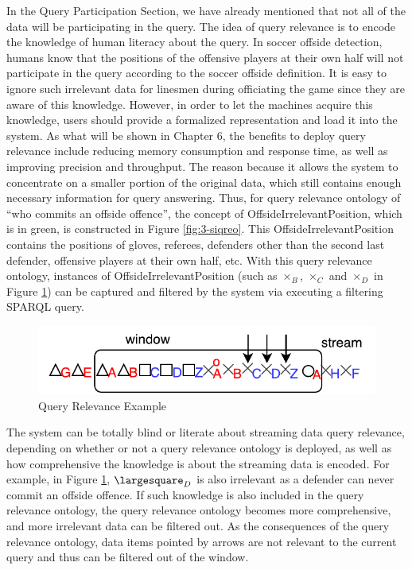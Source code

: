 In the Query Participation Section, we have already mentioned that not all of the data will be participating in the query.
The idea of query relevance is to encode the knowledge of human literacy about the query. 
In soccer offside detection, humans know that the positions of the offensive players at their own half will not participate in the query according to the soccer offside definition. 
It is easy to ignore such irrelevant data for linesmen during officiating the game since they are aware of this knowledge. 
However, in order to let the machines acquire this knowledge, users should provide a formalized representation and load it into the system. 
As what will be shown in Chapter 6, the benefits to deploy query relevance include reducing memory consumption and response time, as well as improving precision and throughput. 
The reason because it allows the system to concentrate on a smaller portion of the original data, which still contains enough necessary information for query answering. 
Thus, for query relevance ontology of ``who commits an offside offence'', the concept of OffsideIrrelevantPosition, which is in green, is constructed in Figure \ref{fig:3-siqreo}. 
This OffsideIrrelevantPosition contains the positions of gloves, referees, defenders other than the second last defender, offensive players at their own half, etc. 
With this query relevance ontology, instances of OffsideIrrelevantPosition (such as  $\times_{B}$, $\times_{C}$ and $\times_{D}$ in Figure \ref{fig:3-siqre}) can be captured and filtered by the system via executing a filtering SPARQL query. 

\begin{figure}[!htbp]
	\centering
    \includegraphics[width=5in]{img/3-siqre.pdf}
    \caption{Query Relevance Example}
    \label{fig:3-siqre}
\end{figure}

The system can be totally blind or literate about streaming data query relevance, depending on whether or not a query relevance ontology is deployed, as well as how comprehensive the knowledge is about the streaming data is encoded. 
For example, in Figure \ref{fig:3-siqre}, $\largesquare_{D}$ is also irrelevant as a defender can never commit an offside offence. 
If such knowledge is also included in the query relevance ontology, the query relevance ontology becomes more comprehensive, and more irrelevant data can be filtered out. 
As the consequences of the query relevance ontology, data items pointed by arrows are not relevant to the current query and thus can be filtered out of the window.
%
